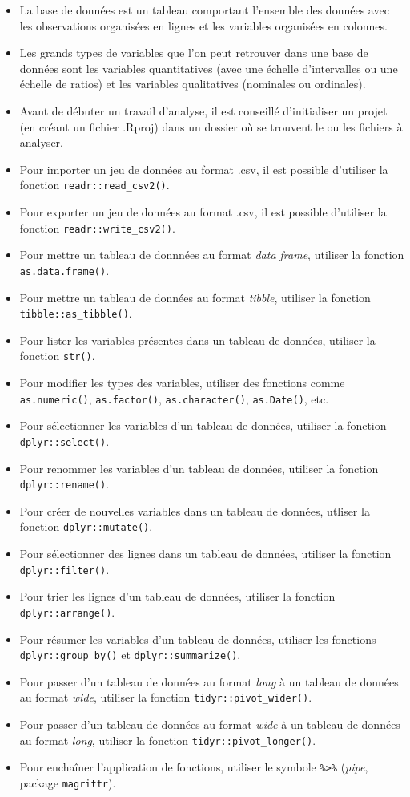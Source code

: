 \documentclass[
  french,
]{book}
\providecommand{\tightlist}{%
  \setlength{\itemsep}{0pt}\setlength{\parskip}{0pt}}
\begin{document}
\begin{itemize}
\tightlist
\item
  La base de données est un tableau comportant l'ensemble des données avec les observations organisées en lignes et les variables organisées en colonnes.
\item
  Les grands types de variables que l'on peut retrouver dans une base de données sont les variables quantitatives (avec une échelle d'intervalles ou une échelle de ratios) et les variables qualitatives (nominales ou ordinales).
\item
  Avant de débuter un travail d'analyse, il est conseillé d'initialiser un projet (en créant un fichier .Rproj) dans un dossier où se trouvent le ou les fichiers à analyser.
\item
  Pour importer un jeu de données au format .csv, il est possible d'utiliser la fonction \texttt{readr::read\_csv2()}.
\item
  Pour exporter un jeu de données au format .csv, il est possible d'utiliser la fonction \texttt{readr::write\_csv2()}.
\item
  Pour mettre un tableau de donnnées au format \emph{data frame}, utiliser la fonction \texttt{as.data.frame()}.
\item
  Pour mettre un tableau de données au format \emph{tibble}, utiliser la fonction \texttt{tibble::as\_tibble()}.
\item
  Pour lister les variables présentes dans un tableau de données, utiliser la fonction \texttt{str()}.
\item
  Pour modifier les types des variables, utiliser des fonctions comme \texttt{as.numeric()}, \texttt{as.factor()}, \texttt{as.character()}, \texttt{as.Date()}, etc.
\item
  Pour sélectionner les variables d'un tableau de données, utiliser la fonction \texttt{dplyr::select()}.
\item
  Pour renommer les variables d'un tableau de données, utiliser la fonction \texttt{dplyr::rename()}.
\item
  Pour créer de nouvelles variables dans un tableau de données, utliser la fonction \texttt{dplyr::mutate()}.
\item
  Pour sélectionner des lignes dans un tableau de données, utiliser la fonction \texttt{dplyr::filter()}.
\item
  Pour trier les lignes d'un tableau de données, utiliser la fonction \texttt{dplyr::arrange()}.
\item
  Pour résumer les variables d'un tableau de données, utiliser les fonctions \texttt{dplyr::group\_by()} et \texttt{dplyr::summarize()}.
\item
  Pour passer d'un tableau de données au format \emph{long} à un tableau de données au format \emph{wide}, utiliser la fonction \texttt{tidyr::pivot\_wider()}.
\item
  Pour passer d'un tableau de données au format \emph{wide} à un tableau de données au format \emph{long}, utiliser la fonction \texttt{tidyr::pivot\_longer()}.
\item
  Pour enchaîner l'application de fonctions, utiliser le symbole \texttt{\%\textgreater{}\%} (\emph{pipe}, package \texttt{magrittr}).
\end{itemize}
\end{document}

